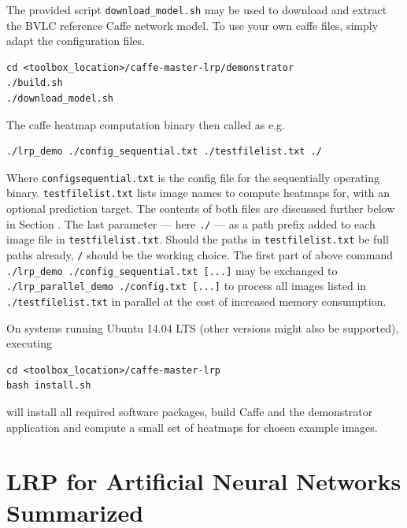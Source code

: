 \documentclass[a4wide]{article}
\begin{document}
 The provided script \texttt{download\_model.sh} may be used to download and extract the  BVLC reference Caffe network model. To use your own caffe files, simply adapt the configuration files.
\begin{Verbatim}[frame = single]
cd <toolbox_location>/caffe-master-lrp/demonstrator
./build.sh
./download_model.sh
\end{Verbatim}
The caffe heatmap computation binary then called as e.g.
\begin{Verbatim}[frame = single]
./lrp_demo ./config_sequential.txt ./testfilelist.txt ./
\end{Verbatim}
Where \texttt{config\textunderscore sequential.txt} is the config file for the sequentially operating binary. \texttt{testfilelist.txt} lists image names to compute heatmaps for, with an optional prediction target. The contents of both files are discussed further below in Section . The last parameter --- here \texttt{./} --- as a path prefix added to each image file in \texttt{testfilelist.txt}. Should the paths in \texttt{testfilelist.txt} be full paths already, \texttt{/} should be the working choice.
The first part of above command \texttt{./lrp\_demo ./config\_sequential.txt [...]} may be exchanged to \texttt{./lrp\_parallel\_demo ./config.txt [...]} to process all images listed in \texttt{./testfilelist.txt} in parallel at the cost of increased memory consumption.

On systems running Ubuntu 14.04 LTS (other versions might also be supported), executing
\begin{Verbatim}[frame = single]
cd <toolbox_location>/caffe-master-lrp
bash install.sh
\end{Verbatim}
will install all required software packages, build Caffe and the demonstrator application and compute a small set of heatmaps for chosen example images.

\section{LRP for Artificial Neural Networks Summarized}
\label{sec:lrp}
\end{document}
